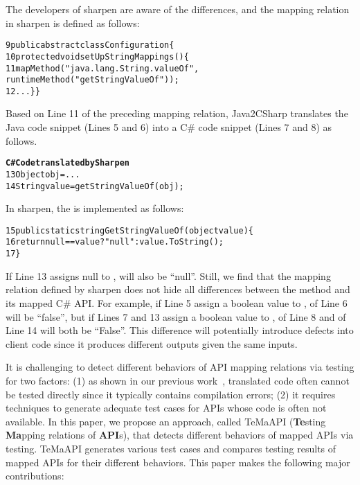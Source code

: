 The developers of sharpen are aware of the differences, and the mapping relation in sharpen is defined as follows:

\begin{CodeOut}
\begin{alltt}
9 public abstract class Configuration \{
10 protected void setUpStringMappings() \{
11   mapMethod("java.lang.String.valueOf",
              runtimeMethod("getStringValueOf"));
12  ...\} \}
\end{alltt}
\end{CodeOut}

Based on Line 11 of the preceding mapping relation, Java2CSharp translates the Java code snippet (Lines 5 and 6) into a C\# code snippet (Lines 7 and 8) as follows.

\begin{CodeOut}%
\begin{alltt}
\textbf{  C# Code translated by Sharpen}
13 Object obj = ...
14 String value = getStringValueOf(obj);
\end{alltt}
\end{CodeOut}

In sharpen, the  is implemented as follows:

\begin{CodeOut}%
\begin{alltt}
15 public static string GetStringValueOf(object value)\{
16  return null == value? "null": value.ToString();
17	\}
\end{alltt}
\end{CodeOut}

If Line 13 assigns null to ,  will also be ``null''. Still, we find that the mapping relation defined by sharpen does not hide all differences between the  method and its mapped C\# API. For example, if Line 5 assign a  boolean value to ,  of Line 6 will be ``false'', but if Lines 7 and 13 assign a  boolean value to ,  of Line 8 and  of Line 14 will both be ``False''. This difference will potentially introduce defects into client code since it produces different outputs given the same inputs.

It is challenging to detect different behaviors of API mapping relations via testing for two factors: (1) as shown in our previous work~\cite{zhong2010mining}, translated code often cannot be tested directly since it typically contains compilation errors; (2) it requires techniques to generate adequate test cases for APIs whose code is often not available. In this paper, we propose an approach, called TeMaAPI (\textbf{Te}sting \textbf{Ma}pping relations of \textbf{API}s), that detects different behaviors of mapped APIs via testing. TeMaAPI generates various test cases and compares testing results of mapped APIs for their different behaviors. This paper makes the following major contributions:

